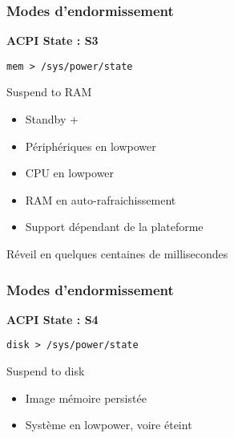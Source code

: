 \begin{frame}
	\frametitle{Modes d'endormissement}
	\textbf{ACPI State : S3}

	\texttt{mem > /sys/power/state}
	\begin{block}{Suspend to RAM}
		\begin{itemize}
			\item Standby +
			\item Périphériques en lowpower
			\item CPU en lowpower
			\item RAM en auto-rafraichissement
			\item Support dépendant de la plateforme
		\end{itemize}
	\end{block}
	Réveil en quelques centaines de millisecondes
\end{frame}
\begin{frame}
	\frametitle{Modes d'endormissement}
	\textbf{ACPI State : S4}

	\texttt{disk > /sys/power/state}
	\begin{block}{Suspend to disk}
		\begin{itemize}
			\item Image mémoire persistée
			\item Système en lowpower, voire éteint
		\end{itemize}
	\end{block}
	\vspace{-0.5cm}
	\begin{minipage}[t]{0.45\linewidth}
	\end{minipage}
	\begin{minipage}[t]{0.45\linewidth}
	\end{minipage}
\end{frame}

